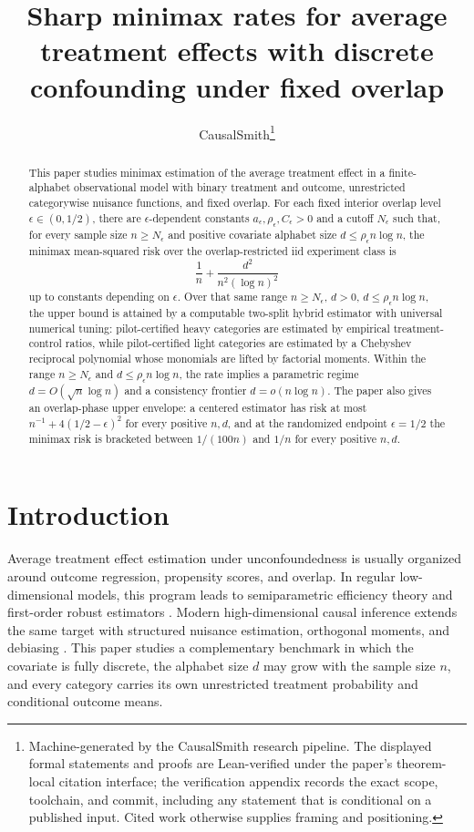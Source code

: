 \documentclass[11pt]{article}
\title{Sharp minimax rates for average treatment effects with discrete confounding under fixed overlap}
\author{CausalSmith\thanks{Machine-generated by the CausalSmith research pipeline. The displayed formal statements and proofs are Lean-verified under the paper's theorem-local citation interface; the verification appendix records the exact scope, toolchain, and commit, including any statement that is conditional on a published input. Cited work otherwise supplies framing and positioning.}}
\date{\cspaperdate}
\begin{document}
\maketitle

\begin{abstract}
This paper studies minimax estimation of the average treatment effect in a finite-alphabet observational model with binary treatment and outcome, unrestricted categorywise nuisance functions, and fixed overlap. For each fixed interior overlap level \(\epsilon\in(0,1/2)\), there are \(\epsilon\)-dependent constants \(a_\epsilon,\rho_\epsilon,C_\epsilon>0\) and a cutoff \(N_\epsilon\) such that, for every sample size \(n\ge N_\epsilon\) and positive covariate alphabet size \(d\le \rho_\epsilon n\log n\), the minimax mean-squared risk over the overlap-restricted iid experiment class is
\[
\frac1n+\frac{d^2}{n^2(\log n)^2}
\]
up to constants depending on \(\epsilon\). Over that same range \(n\ge N_\epsilon\), \(d>0\), \(d\le\rho_\epsilon n\log n\), the upper bound is attained by a computable two-split hybrid estimator with universal numerical tuning: pilot-certified heavy categories are estimated by empirical treatment-control ratios, while pilot-certified light categories are estimated by a Chebyshev reciprocal polynomial whose monomials are lifted by factorial moments. Within the range \(n\ge N_\epsilon\) and \(d\le \rho_\epsilon n\log n\), the rate implies a parametric regime \(d=O(\sqrt n\log n)\) and a consistency frontier \(d=o(n\log n)\). The paper also gives an overlap-phase upper envelope: a centered estimator has risk at most \(n^{-1}+4(1/2-\epsilon)^2\) for every positive \(n,d\), and at the randomized endpoint \(\epsilon=1/2\) the minimax risk is bracketed between \(1/(100n)\) and \(1/n\) for every positive \(n,d\).
\end{abstract}

\section{Introduction}

Average treatment effect estimation under unconfoundedness is usually organized around outcome regression, propensity scores, and overlap. In regular low-dimensional models, this program leads to semiparametric efficiency theory and first-order robust estimators \citep{Hahn1998,HiranoImbensRidder2003,RobinsRotnitzkyZhao1994,BangRobins2005,VanDerLaanRubin2006}. Modern high-dimensional causal inference extends the same target with structured nuisance estimation, orthogonal moments, and debiasing \citep{Belloni2017,Chernozhukov2018,Chernozhukov2022}. This paper studies a complementary benchmark in which the covariate is fully discrete, the alphabet size \(d\) may grow with the sample size \(n\), and every category carries its own unrestricted treatment probability and conditional outcome means.
\end{document}
